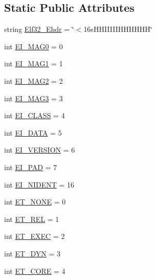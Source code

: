 \subsection*{Static Public Attributes}
\begin{DoxyCompactItemize}
\item 
string \hyperlink{clasself_1_1_e_l_f_object_afe39f92a8299813385090c69ac2e6a51}{Elf32\+\_\+\+Ehdr} = \char`\"{}$<$16s\+H\+H\+I\+I\+I\+I\+I\+H\+H\+H\+H\+H\+H\char`\"{}
\item 
int \hyperlink{clasself_1_1_e_l_f_object_abd4387dff6d4d596f1ce77f5d6e2c18f}{E\+I\+\_\+\+M\+A\+G0} = 0
\item 
int \hyperlink{clasself_1_1_e_l_f_object_a33d886b2e3419793cb9439032378ec88}{E\+I\+\_\+\+M\+A\+G1} = 1
\item 
int \hyperlink{clasself_1_1_e_l_f_object_ac222ac9fb8955262b0d6c922344a19b2}{E\+I\+\_\+\+M\+A\+G2} = 2
\item 
int \hyperlink{clasself_1_1_e_l_f_object_a29187eaddf11c4260111df164080a0eb}{E\+I\+\_\+\+M\+A\+G3} = 3
\item 
int \hyperlink{clasself_1_1_e_l_f_object_a69644b6dca1963b86d1fbdc8b80b2d74}{E\+I\+\_\+\+C\+L\+A\+SS} = 4
\item 
int \hyperlink{clasself_1_1_e_l_f_object_ae77dc1d7dd015de65fff01e6875c9bde}{E\+I\+\_\+\+D\+A\+TA} = 5
\item 
int \hyperlink{clasself_1_1_e_l_f_object_abc3f9a82d0648db31618e95828c66585}{E\+I\+\_\+\+V\+E\+R\+S\+I\+ON} = 6
\item 
int \hyperlink{clasself_1_1_e_l_f_object_a40746adb4cdd8b3ad528225061bbaae5}{E\+I\+\_\+\+P\+AD} = 7
\item 
int \hyperlink{clasself_1_1_e_l_f_object_a58115dbff5ace6382d2d1b569efbb5f7}{E\+I\+\_\+\+N\+I\+D\+E\+NT} = 16
\item 
int \hyperlink{clasself_1_1_e_l_f_object_aaf68bf2b20161d9875d2e56d9e2d10c0}{E\+T\+\_\+\+N\+O\+NE} = 0
\item 
int \hyperlink{clasself_1_1_e_l_f_object_a62458e3aa560c823484e38ecd1129e2d}{E\+T\+\_\+\+R\+EL} = 1
\item 
int \hyperlink{clasself_1_1_e_l_f_object_aa0096390dda0fa912b1c1aa2e562132d}{E\+T\+\_\+\+E\+X\+EC} = 2
\item 
int \hyperlink{clasself_1_1_e_l_f_object_a01223871ee1c400f781465b797e38acf}{E\+T\+\_\+\+D\+YN} = 3
\item 
int \hyperlink{clasself_1_1_e_l_f_object_a3f91b929029f713a6578ed29fa0216e1}{E\+T\+\_\+\+C\+O\+RE} = 4
\item 

\end{DoxyCompactItemize}
